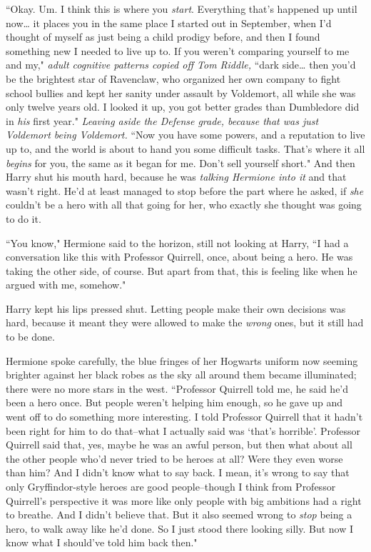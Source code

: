 ``Okay. Um. I think this is where you \emph{start}. Everything that's happened up until now{\ldots} it places you in the same place I started out in September, when I'd thought of myself as just being a child prodigy before, and then I found something new I needed to live up to. If you weren't comparing yourself to me and my," \emph{adult cognitive patterns copied off Tom Riddle,} ``dark side{\ldots} then you'd be the brightest star of Ravenclaw, who organized her own company to fight school bullies and kept her sanity under assault by Voldemort, all while she was only twelve years old. I looked it up, you got better grades than Dumbledore did in \emph{his} first year." \emph{Leaving aside the Defense grade, because that was just Voldemort being Voldemort.} ``Now you have some powers, and a reputation to live up to, and the world is about to hand you some difficult tasks. That's where it all \emph{begins} for you, the same as it began for me. Don't sell yourself short." And then Harry shut his mouth hard, because he was \emph{talking Hermione into it} and that wasn't right. He'd at least managed to stop before the part where he asked, if \emph{she} couldn't be a hero with all that going for her, who exactly she thought was going to do it.

``You know," Hermione said to the horizon, still not looking at Harry, ``I had a conversation like this with Professor Quirrell, once, about being a hero. He was taking the other side, of course. But apart from that, this is feeling like when he argued with me, somehow."

Harry kept his lips pressed shut. Letting people make their own decisions was hard, because it meant they were allowed to make the \emph{wrong} ones, but it still had to be done.

Hermione spoke carefully, the blue fringes of her Hogwarts uniform now seeming brighter against her black robes as the sky all around them became illuminated; there were no more stars in the west. ``Professor Quirrell told me, he said he'd been a hero once. But people weren't helping him enough, so he gave up and went off to do something more interesting. I told Professor Quirrell that it hadn't been right for him to do that\---what I actually said was `that's horrible'. Professor Quirrell said that, yes, maybe he was an awful person, but then what about all the other people who'd never tried to be heroes at all? Were they even worse than him? And I didn't know what to say back. I mean, it's wrong to say that only Gryffindor-style heroes are good people\---though I think from Professor Quirrell's perspective it was more like only people with big ambitions had a right to breathe. And I didn't believe that. But it also seemed wrong to \emph{stop} being a hero, to walk away like he'd done. So I just stood there looking silly. But now I know what I should've told him back then."

